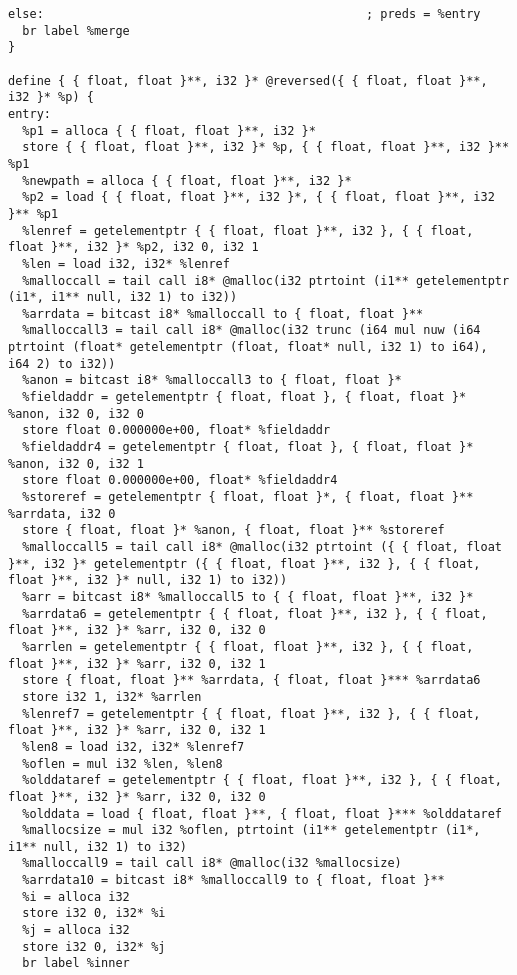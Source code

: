 \documentclass[main.tex]{subfiles}
\begin{document}
{\begin{lstlisting}
else:                                             ; preds = %entry
  br label %merge
}

define { { float, float }**, i32 }* @reversed({ { float, float }**, i32 }* %p) {
entry:
  %p1 = alloca { { float, float }**, i32 }*
  store { { float, float }**, i32 }* %p, { { float, float }**, i32 }** %p1
  %newpath = alloca { { float, float }**, i32 }*
  %p2 = load { { float, float }**, i32 }*, { { float, float }**, i32 }** %p1
  %lenref = getelementptr { { float, float }**, i32 }, { { float, float }**, i32 }* %p2, i32 0, i32 1
  %len = load i32, i32* %lenref
  %malloccall = tail call i8* @malloc(i32 ptrtoint (i1** getelementptr (i1*, i1** null, i32 1) to i32))
  %arrdata = bitcast i8* %malloccall to { float, float }**
  %malloccall3 = tail call i8* @malloc(i32 trunc (i64 mul nuw (i64 ptrtoint (float* getelementptr (float, float* null, i32 1) to i64), i64 2) to i32))
  %anon = bitcast i8* %malloccall3 to { float, float }*
  %fieldaddr = getelementptr { float, float }, { float, float }* %anon, i32 0, i32 0
  store float 0.000000e+00, float* %fieldaddr
  %fieldaddr4 = getelementptr { float, float }, { float, float }* %anon, i32 0, i32 1
  store float 0.000000e+00, float* %fieldaddr4
  %storeref = getelementptr { float, float }*, { float, float }** %arrdata, i32 0
  store { float, float }* %anon, { float, float }** %storeref
  %malloccall5 = tail call i8* @malloc(i32 ptrtoint ({ { float, float }**, i32 }* getelementptr ({ { float, float }**, i32 }, { { float, float }**, i32 }* null, i32 1) to i32))
  %arr = bitcast i8* %malloccall5 to { { float, float }**, i32 }*
  %arrdata6 = getelementptr { { float, float }**, i32 }, { { float, float }**, i32 }* %arr, i32 0, i32 0
  %arrlen = getelementptr { { float, float }**, i32 }, { { float, float }**, i32 }* %arr, i32 0, i32 1
  store { float, float }** %arrdata, { float, float }*** %arrdata6
  store i32 1, i32* %arrlen
  %lenref7 = getelementptr { { float, float }**, i32 }, { { float, float }**, i32 }* %arr, i32 0, i32 1
  %len8 = load i32, i32* %lenref7
  %oflen = mul i32 %len, %len8
  %olddataref = getelementptr { { float, float }**, i32 }, { { float, float }**, i32 }* %arr, i32 0, i32 0
  %olddata = load { float, float }**, { float, float }*** %olddataref
  %mallocsize = mul i32 %oflen, ptrtoint (i1** getelementptr (i1*, i1** null, i32 1) to i32)
  %malloccall9 = tail call i8* @malloc(i32 %mallocsize)
  %arrdata10 = bitcast i8* %malloccall9 to { float, float }**
  %i = alloca i32
  store i32 0, i32* %i
  %j = alloca i32
  store i32 0, i32* %j
  br label %inner


\end{lstlisting}}
\end{document}
